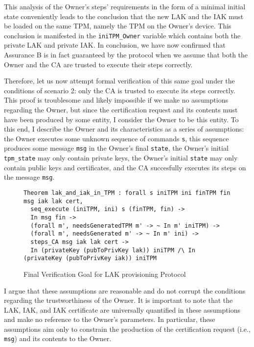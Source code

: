  This analysis of the Owner's steps' requirements in the form of a minimal initial state conveniently leads to the conclusion that the new LAK and the IAK must be  loaded on the same TPM, namely the TPM on the Owner's device. This conclusion is manifested in the \verb|iniTPM_Owner| variable which contains both the private LAK and private IAK. In conclusion, we have now confirmed that Assurance B is in fact guaranteed by the protocol when we assume that both the Owner and the CA are trusted to execute their steps correctly. 

Therefore, let us now attempt formal verification of this same goal under the conditions of scenario 2: only the CA is trusted to execute its steps correctly. This proof is troublesome and likely impossible if we make no assumptions regarding the Owner, but since the certification request and its contents must have been produced by some entity, I consider the Owner to be this entity.
To this end, I describe the Owner and its characteristics as a series of assumptions: the Owner executes some unknown sequence of commands \verb|s|, this sequence produces some message \verb|msg| in the Owner's final \verb|state|, the Owner's initial \verb|tpm_state| may only contain private keys, the Owner's initial \verb|state| may only contain public keys and certificates, and the CA succesfully executes its steps on the message \verb|msg|. 
\begin{figure}[h]
\begin{lstlisting}[language=Coq]
Theorem lak_and_iak_in_TPM : forall s iniTPM ini finTPM fin msg iak lak cert,
  seq_execute (iniTPM, ini) s (finTPM, fin) -> 
  In msg fin ->
  (forall m', needsGeneratedTPM m' -> ~ In m' iniTPM) ->
  (forall m', needsGenerated m' -> ~ In m' ini) ->
  steps_CA msg iak lak cert ->
  In (privateKey (pubToPrivKey lak)) iniTPM /\ In (privateKey (pubToPrivKey iak)) iniTPM
\end{lstlisting}
\caption{Final Verification Goal for LAK provisioning Protocol}
\label{fig:lak_goal}
\end{figure}
I argue that these assumptions are reasonable and do not corrupt the conditions regarding the trustworthiness of the Owner. It is important to note that the LAK, IAK, and IAK certificate are universally quantified in these assumptions and make no reference to the Owner's parameters. In particular, these assumptions aim only to constrain the production of the certification request (i.e., \verb|msg|) and its contents to the Owner. 
